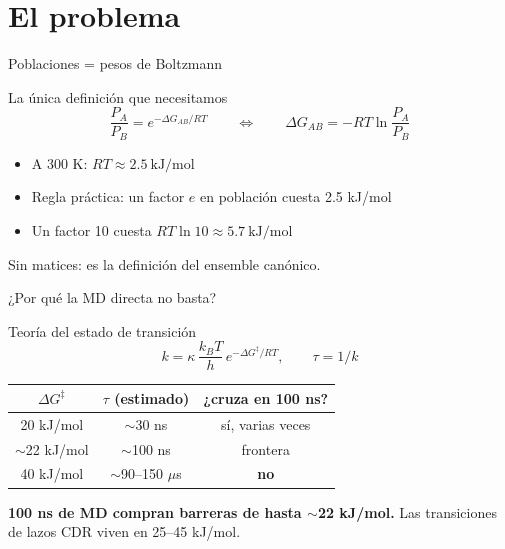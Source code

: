 \documentclass[aspectratio=169,11pt]{beamer}
\newcommand{\Fuente}[1]{{\scriptsize\color{migris} #1}}
\begin{document}
\section{El problema}

\begin{frame}{Poblaciones = pesos de Boltzmann}
  \begin{block}{La única definición que necesitamos}
    $$\frac{P_A}{P_B} = e^{-\Delta G_{AB}/RT} \qquad\Longleftrightarrow\qquad \Delta G_{AB} = -RT\ln\frac{P_A}{P_B}$$
  \end{block}
  \vspace{0.5em}
  \begin{itemize}
    \item A 300 K: $RT \approx \SI{2.5}{\kilo\joule\per\mole}$
    \item Regla práctica: \alert{un factor $e$ en población cuesta 2.5 kJ/mol}
    \item Un factor 10 cuesta $RT\ln 10 \approx \SI{5.7}{\kilo\joule\per\mole}$
  \end{itemize}
  \vspace{0.5em}
  \Fuente{Sin matices: es la definición del ensemble canónico.}
\end{frame}

\begin{frame}{¿Por qué la MD directa no basta?}
  \begin{block}{Teoría del estado de transición}
    $$k = \kappa\,\frac{k_BT}{h}\,e^{-\Delta G^{\ddagger}/RT}, \qquad \tau = 1/k$$
  \end{block}
  \begin{center}
  \begin{tabular}{ccc}
    \toprule
    $\Delta G^{\ddagger}$ & $\tau$ (estimado) & ¿cruza en 100 ns? \\
    \midrule
    20 kJ/mol & $\sim$30 ns & sí, varias veces \\
    \alert{$\sim$22 kJ/mol} & \alert{$\sim$100 ns} & \alert{frontera} \\
    40 kJ/mol & $\sim$90–150 $\mu$s & \textbf{no} \\
    \bottomrule
  \end{tabular}
  \end{center}
  \vspace{0.8em}
  \textbf{100 ns de MD compran barreras de hasta $\sim$22 kJ/mol.} Las transiciones de lazos CDR viven en 25–45 kJ/mol.
\end{frame}
\end{document}
